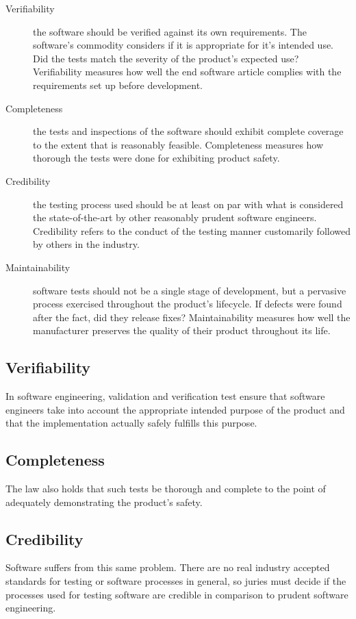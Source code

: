 \begin{description}
\item[Verifiability] the software should be verified against its own 
requirements. The software's commodity considers if it is appropriate for it's
intended use. Did the tests match the severity of the product's expected
use? Verifiability measures how well the end software article complies with the
requirements set up before development.
\item[Completeness] the tests and inspections of the software should exhibit
complete coverage to the extent that is reasonably feasible. Completeness
measures how thorough the tests were done for exhibiting product safety.
\item[Credibility] the testing process used should be at least on par with what
is considered the state-of-the-art by other reasonably prudent software
engineers. Credibility refers to the conduct of
the testing manner customarily followed by others in the industry.
\item[Maintainability] software tests should not be a single stage of
development, but a pervasive process exercised throughout the product's
lifecycle. If defects were found after the fact, did they release
fixes? Maintainability measures how well the manufacturer preserves the quality
of their product throughout its life.
\end{description}

\subsection{Verifiability}
In software engineering, validation and verification test ensure that software
engineers take into account the appropriate intended purpose of the product and
that the implementation actually safely fulfills this purpose.

\subsection{Completeness}
The law also holds that such tests be thorough and complete to the point of
adequately demonstrating the product's safety. 

\subsection{Credibility}

Software suffers from this same problem. There are no real industry accepted
standards for testing or software processes in
general, so juries must decide if the processes used
for testing software are credible in comparison to prudent software engineering. 


